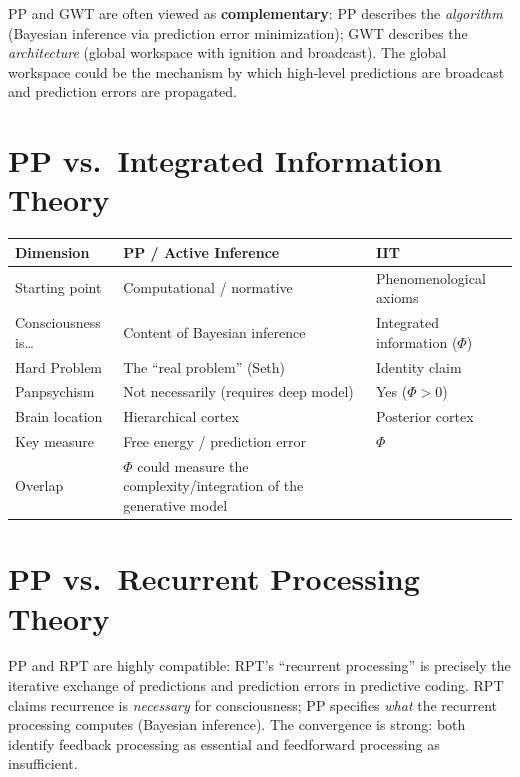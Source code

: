 \documentclass[11pt,a4paper]{report}
\begin{document}
PP and GWT are often viewed as \textbf{complementary}: PP describes the \emph{algorithm} (Bayesian inference via prediction error minimization); GWT describes the \emph{architecture} (global workspace with ignition and broadcast). The global workspace could be the mechanism by which high-level predictions are broadcast and prediction errors are propagated.

\section{PP vs.\ Integrated Information Theory}

\begin{compbox}
\renewcommand{\arraystretch}{1.4}
\begin{tabular}{>{\raggedright}p{3cm} >{\raggedright}p{5.2cm} >{\raggedright\arraybackslash}p{4.8cm}}
  \toprule
  \textbf{Dimension} & \textbf{PP / Active Inference} & \textbf{IIT} \\
  \midrule
  Starting point & Computational / normative & Phenomenological axioms \\
  Consciousness is\ldots & Content of Bayesian inference & Integrated information ($\Phi$) \\
  Hard Problem & The ``real problem'' (Seth) & Identity claim \\
  Panpsychism & Not necessarily (requires deep model) & Yes ($\Phi > 0$) \\
  Brain location & Hierarchical cortex & Posterior cortex \\
  Key measure & Free energy / prediction error & $\Phi$ \\
  Overlap & $\Phi$ could measure the complexity/integration of the generative model \\
  \bottomrule
\end{tabular}
\end{compbox}

\section{PP vs.\ Recurrent Processing Theory}

PP and RPT are highly compatible: RPT's ``recurrent processing'' is precisely the iterative exchange of predictions and prediction errors in predictive coding. RPT claims recurrence is \emph{necessary} for consciousness; PP specifies \emph{what} the recurrent processing computes (Bayesian inference). The convergence is strong: both identify feedback processing as essential and feedforward processing as insufficient.
\end{document}
